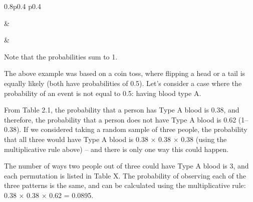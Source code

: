 \documentclass[
]{memoir}
\begin{document}
\begin{table}[ht]
\begin{centerbox}
\begin{threeparttable}
\begin{tabularx}{0.8\textwidth}{p{} p{}}
\hhline{}

 &
 \tabularnewline[-0.5pt]


\hhline{}

 &
 \tabularnewline[-0.5pt]


\end{tabularx}
\end{threeparttable}\par\end{centerbox}

\end{table}
 

Note that the probabilities sum to 1.

The above example was based on a coin toss, where flipping a head or a tail is equally likely (both have probabilities of 0.5). Let's consider a case where the probability of an event is not equal to 0.5: having blood type A.

From Table 2.1, the probability that a person has Type A blood is 0.38, and therefore, the probability that a person does not have Type A blood is 0.62 (1--0.38). If we considered taking a random sample of three people, the probability that all three would have Type A blood is 0.38 × 0.38 × 0.38 (using the multiplicative rule above) -- and there is only one way this could happen.

The number of ways two people out of three could have Type A blood is 3, and each permutation is listed in Table X. The probability of observing each of the three patterns is the same, and can be calculated using the multiplicative rule: 0.38 × 0.38 × 0.62 = 0.0895.
\end{document}
